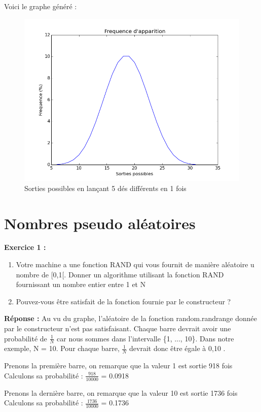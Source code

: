\documentclass[oneside]{book}
\begin{document}
Voici le graphe généré : 
\begin{figure}[h!]
	\centering
	\includegraphics[width=\textwidth]{lancer_de_5_des.png}
	\caption{Sorties possibles en lançant 5 dés différents en 1 fois}
\end{figure}
\section{Nombres pseudo aléatoires}
\textbf{Exercice 1 :}
\begin{enumerate}
	\item Votre machine a une fonction RAND qui vous fournit de manière aléatoire u nombre de [0,1[. Donner un algorithme utilisant la fonction RAND fournissant un nombre entier entre 1 et N
	\item Pouvez-vous être satisfait de la fonction fournie par le constructeur ?
\end{enumerate}

\textbf{Réponse :} 
Au vu du graphe, l'aléatoire de la fonction random.randrange donnée par le constructeur n'est pas satisfaisant. Chaque barre devrait avoir une probabilité de $\frac{1}{N}$ car nous sommes dans l'intervalle \{1, ..., 10\}. Dans notre exemple, N = 10. Pour chaque barre, $\frac{1}{N}$ devrait donc être égale à 0,10 .

Prenons la première barre, on remarque que la valeur 1 est sortie 918 fois Calculons sa probabilité : $\frac{918}{10000}$ = 0.0918

Prenons la dernière barre, on remarque que la valeur 10 est sortie 1736 fois Calculons sa probabilité : $\frac{1736}{10000}$ = 0.1736
\end{document}
